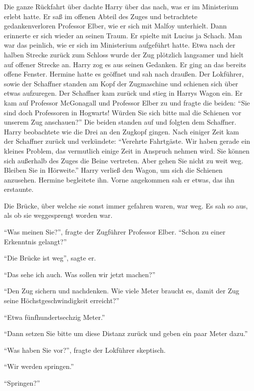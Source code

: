 Die ganze Rückfahrt über dachte Harry über das nach, was er im Ministerium erlebt hatte. Er saß im offenen Abteil des Zuges und betrachtete gedankenverloren Professor Elber, wie er sich mit Malfoy unterhielt. Dann erinnerte er sich wieder an seinen Traum. Er spielte mit Lucius ja Schach. Man war das peinlich, wie er sich im Ministerium aufgeführt hatte. Etwa nach der halben Strecke zurück zum Schloss wurde der Zug plötzlich langsamer und hielt auf offener Strecke an. Harry zog es aus seinen Gedanken. Er ging an das bereits offene Fenster. Hermine hatte es geöffnet und sah nach draußen. Der Lokführer, sowie der Schaffner standen am Kopf der Zugmaschine und schienen sich über etwas aufzuregen. Der Schaffner kam zurück und stieg in Harrys Wagon ein. Er kam auf Professor McGonagall und Professor Elber zu und fragte die beiden: \enquote{Sie sind doch Professoren in Hogwarts! Würden Sie sich bitte mal die Schienen vor unserem Zug anschauen?} Die beiden standen auf und folgten dem Schaffner. Harry beobachtete wie die Drei an den Zugkopf gingen. Nach einiger Zeit kam der Schaffner zurück und verkündete: \enquote{Verehrte Fahrtgäste. Wir haben gerade ein kleines Problem, das vermutlich einige Zeit in Anspruch nehmen wird. Sie können sich außerhalb des Zuges die Beine vertreten. Aber gehen Sie nicht zu weit weg. Bleiben Sie in Hörweite.} Harry verließ den Wagon, um sich die Schienen anzusehen. Hermine begleitete ihn. Vorne angekommen sah er etwas, das ihn erstaunte.

Die Brücke, über welche sie sonst immer gefahren waren, war weg. Es sah so aus, als ob sie weggesprengt worden war.

\enquote{Was meinen Sie?}, fragte der Zugführer Professor Elber. \enquote{Schon zu einer Erkenntnis gelangt?}

\enquote{Die Brücke ist weg}, sagte er.

\enquote{Das sehe ich auch. Was sollen wir jetzt machen?}

\enquote{Den Zug sichern und nachdenken. \gst Wie viele Meter braucht es, damit der Zug seine Höchstgeschwindigkeit erreicht?}

\enquote{Etwa fünfhundertsechzig Meter.}

\enquote{Dann setzen Sie bitte um diese Distanz zurück und geben ein paar Meter dazu.}

\enquote{Was haben Sie vor?}, fragte der Lokführer skeptisch.

\enquote{Wir werden springen.}

\enquote{Springen?}

